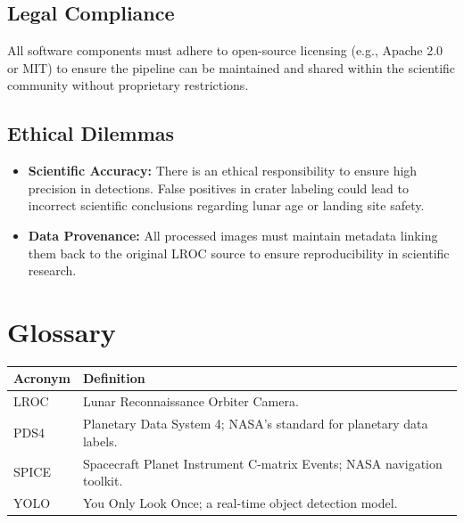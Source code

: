 \documentclass[12pt]{article}
\begin{document}
\subsection{Legal Compliance}
All software components must adhere to open-source licensing (e.g., Apache 2.0 or MIT) to ensure the pipeline can be maintained and shared within the scientific community without proprietary restrictions.

\subsection{Ethical Dilemmas}
\begin{itemize}
    \item \textbf{Scientific Accuracy:} There is an ethical responsibility to ensure high precision in detections. False positives in crater labeling could lead to incorrect scientific conclusions regarding lunar age or landing site safety.
    \item \textbf{Data Provenance:} All processed images must maintain metadata linking them back to the original LROC source to ensure reproducibility in scientific research.
\end{itemize}

\newpage
\section{Glossary}
\begin{tabularx}{\textwidth}{l|X}
\toprule
\textbf{Acronym} & \textbf{Definition} \\ \midrule
LROC & Lunar Reconnaissance Orbiter Camera. \\
PDS4 & Planetary Data System 4; NASA's standard for planetary data labels. \\
SPICE & Spacecraft Planet Instrument C-matrix Events; NASA navigation toolkit. \\
YOLO & You Only Look Once; a real-time object detection model. \\ \bottomrule
\end{tabularx}
\end{document}
